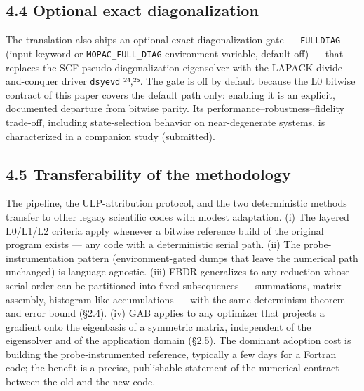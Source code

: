 \documentclass[preprint,12pt]{elsarticle}
\begin{document}
\subsection{4.4 Optional exact diagonalization}
The translation also ships an optional exact-diagonalization gate --- \texttt{FULLDIAG} (input keyword or \texttt{MOPAC\_FULL\_DIAG} environment variable, default off) --- that replaces the SCF pseudo-diagonalization eigensolver with the LAPACK divide-and-conquer driver \texttt{dsyevd} ²⁴,²⁵. The gate is off by default because the L0 bitwise contract of this paper covers the default path only: enabling it is an explicit, documented departure from bitwise parity. Its performance--robustness--fidelity trade-off, including state-selection behavior on near-degenerate systems, is characterized in a companion study (submitted).


\subsection{4.5 Transferability of the methodology}
The pipeline, the ULP-attribution protocol, and the two deterministic methods transfer to other legacy scientific codes with modest adaptation. (i) The layered L0/L1/L2 criteria apply whenever a bitwise reference build of the original program exists --- any code with a deterministic serial path. (ii) The probe-instrumentation pattern (environment-gated dumps that leave the numerical path unchanged) is language-agnostic. (iii) FBDR generalizes to any reduction whose serial order can be partitioned into fixed subsequences --- summations, matrix assembly, histogram-like accumulations --- with the same determinism theorem and error bound (\S{}2.4). (iv) GAB applies to any optimizer that projects a gradient onto the eigenbasis of a symmetric matrix, independent of the eigensolver and of the application domain (\S{}2.5). The dominant adoption cost is building the probe-instrumented reference, typically a few days for a Fortran code; the benefit is a precise, publishable statement of the numerical contract between the old and the new code.
\end{document}
